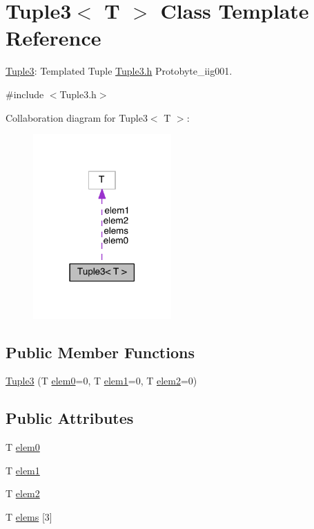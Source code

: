 \hypertarget{class_tuple3}{\section{Tuple3$<$ T $>$ Class Template Reference}
\label{class_tuple3}
}


\hyperlink{class_tuple3}{Tuple3}\-: Templated Tuple \hyperlink{_tuple3_8h}{Tuple3.\-h} Protobyte\-\_\-iig001.  




{\ttfamily \#include $<$Tuple3.\-h$>$}



Collaboration diagram for Tuple3$<$ T $>$\-:
\nopagebreak
\begin{figure}[H]
\begin{center}
\leavevmode
\includegraphics[width=150pt]{class_tuple3__coll__graph}
\end{center}
\end{figure}
\subsection*{Public Member Functions}
\begin{DoxyCompactItemize}
\item 
\hyperlink{class_tuple3_af155c6fae9b730c580433df73fdbf9ec}{Tuple3} (T \hyperlink{class_tuple3_a3c6d4529f9a58ca50029496ad7dd6bb9}{elem0}=0, T \hyperlink{class_tuple3_ac4a0bc9d329cd769ee09034011d60129}{elem1}=0, T \hyperlink{class_tuple3_aa75fc6d2c8fcea235466082d4369a8cf}{elem2}=0)
\end{DoxyCompactItemize}
\subsection*{Public Attributes}
\begin{DoxyCompactItemize}
\item 
T \hyperlink{class_tuple3_a3c6d4529f9a58ca50029496ad7dd6bb9}{elem0}
\item 
T \hyperlink{class_tuple3_ac4a0bc9d329cd769ee09034011d60129}{elem1}
\item 
T \hyperlink{class_tuple3_aa75fc6d2c8fcea235466082d4369a8cf}{elem2}
\item 
T \hyperlink{class_tuple3_a43262e27fc9d8fb4cc9fe69a2fa181ed}{elems} \mbox{[}3\mbox{]}
\end{DoxyCompactItemize}


